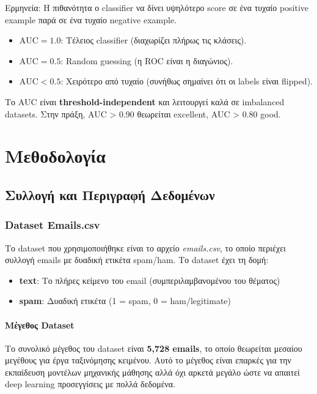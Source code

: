 \documentclass[12pt,a4paper,twoside]{book}
\begin{document}
Ερμηνεία: Η πιθανότητα ο classifier να δίνει υψηλότερο score σε ένα τυχαίο positive example παρά σε ένα τυχαίο negative example.

\begin{itemize}
    \item \(\text{AUC} = 1.0\): Τέλειος classifier (διαχωρίζει πλήρως τις κλάσεις).
    \item \(\text{AUC} = 0.5\): Random guessing (η ROC είναι η διαγώνιος).
    \item \(\text{AUC} < 0.5\): Χειρότερο από τυχαίο (συνήθως σημαίνει ότι οι labels είναι flipped).
\end{itemize}

Το AUC είναι \textbf{threshold-independent} και λειτουργεί καλά σε imbalanced datasets. Στην πράξη, AUC > 0.90 θεωρείται excellent, AUC > 0.80 good.

\chapter{Μεθοδολογία}

\section{Συλλογή και Περιγραφή Δεδομένων}

\subsection{Dataset Emails.csv}

Το dataset που χρησιμοποιήθηκε είναι το αρχείο \textit{emails.csv}, το οποίο περιέχει συλλογή emails με δυαδική ετικέτα spam/ham. Το dataset έχει τη δομή:

\begin{itemize}
    \item \textbf{text}: Το πλήρες κείμενο του email (συμπεριλαμβανομένου του θέματος)
    \item \textbf{spam}: Δυαδική ετικέτα (1 = spam, 0 = ham/legitimate)
\end{itemize}

\subsubsection*{Μέγεθος Dataset}

Το συνολικό μέγεθος του dataset είναι \textbf{5,728 emails}, το οποίο θεωρείται μεσαίου μεγέθους για έργα ταξινόμησης κειμένου. Αυτό το μέγεθος είναι επαρκές για την εκπαίδευση μοντέλων μηχανικής μάθησης αλλά όχι αρκετά μεγάλο ώστε να απαιτεί deep learning προσεγγίσεις με πολλά δεδομένα.
\end{document}
